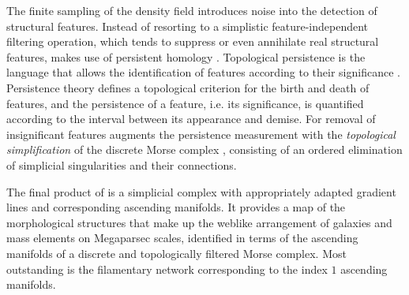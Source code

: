 The finite sampling of the density field introduces noise into the detection of structural features. Instead of resorting to a simplistic feature-independent filtering 
operation, which tends to suppress or even annihilate real structural features, \disperse{} makes use of persistent homology \citep{edelsbrunner2002,edelsbrunner2010}. Topological persistence 
is the language that allows the identification of features according to their significance \citep{edelsbrunner2002}. 
Persistence theory defines a topological criterion for the birth and death of features, and the persistence of a feature, i.e. its significance, is
quantified according to the interval between its appearance and demise. For removal of insignificant 
features \disperse{} augments the persistence measurement with the \emph{topological simplification} of 
the discrete Morse complex \citep{edelsbrunner2002,gyulassy2008}, consisting of an ordered elimination of simplicial singularities and  their connections.

The final product of \disperse{} is a simplicial complex with appropriately adapted gradient lines and corresponding 
ascending manifolds. It provides a map of the morphological structures that make up the weblike 
arrangement of galaxies and mass elements on Megaparsec scales, identified in terms of the ascending 
manifolds of a discrete and topologically filtered Morse complex. Most outstanding is the filamentary network 
corresponding to the index $1$ ascending manifolds. 


